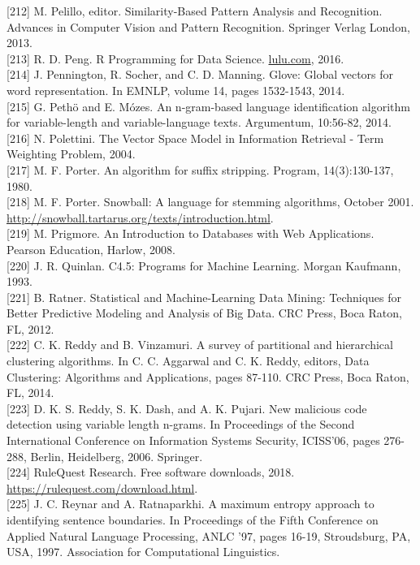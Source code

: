 \documentclass[10pt]{book}
\begin{document}
[212] M. Pelillo, editor. Similarity-Based Pattern Analysis and Recognition. Advances in Computer Vision and Pattern Recognition. Springer Verlag London, 2013.\\[0pt]
[213] R. D. Peng. R Programming for Data Science. \href{http://lulu.com}{lulu.com}, 2016.\\[0pt]
[214] J. Pennington, R. Socher, and C. D. Manning. Glove: Global vectors for word representation. In EMNLP, volume 14, pages 1532-1543, 2014.\\[0pt]
[215] G. Pethö and E. Mózes. An n-gram-based language identification algorithm for variable-length and variable-language texts. Argumentum, 10:56-82, 2014.\\[0pt]
[216] N. Polettini. The Vector Space Model in Information Retrieval - Term Weighting Problem, 2004.\\[0pt]
[217] M. F. Porter. An algorithm for suffix stripping. Program, 14(3):130-137, 1980.\\[0pt]
[218] M. F. Porter. Snowball: A language for stemming algorithms, October 2001. \href{http://snowball.tartarus.org/texts/introduction.html}{http://snowball.tartarus.org/texts/introduction.html}.\\[0pt]
[219] M. Prigmore. An Introduction to Databases with Web Applications. Pearson Education, Harlow, 2008.\\[0pt]
[220] J. R. Quinlan. C4.5: Programs for Machine Learning. Morgan Kaufmann, 1993.\\[0pt]
[221] B. Ratner. Statistical and Machine-Learning Data Mining: Techniques for Better Predictive Modeling and Analysis of Big Data. CRC Press, Boca Raton, FL, 2012.\\[0pt]
[222] C. K. Reddy and B. Vinzamuri. A survey of partitional and hierarchical clustering algorithms. In C. C. Aggarwal and C. K. Reddy, editors, Data Clustering: Algorithms and Applications, pages 87-110. CRC Press, Boca Raton, FL, 2014.\\[0pt]
[223] D. K. S. Reddy, S. K. Dash, and A. K. Pujari. New malicious code detection using variable length n-grams. In Proceedings of the Second International Conference on Information Systems Security, ICISS'06, pages 276-288, Berlin, Heidelberg, 2006. Springer.\\[0pt]
[224] RuleQuest Research. Free software downloads, 2018. \href{https://rulequest.com/download.html}{https://rulequest.com/download.html}.\\[0pt]
[225] J. C. Reynar and A. Ratnaparkhi. A maximum entropy approach to identifying sentence boundaries. In Proceedings of the Fifth Conference on Applied Natural Language Processing, ANLC '97, pages 16-19, Stroudsburg, PA, USA, 1997. Association for Computational Linguistics.\\[0pt]
\end{document}
